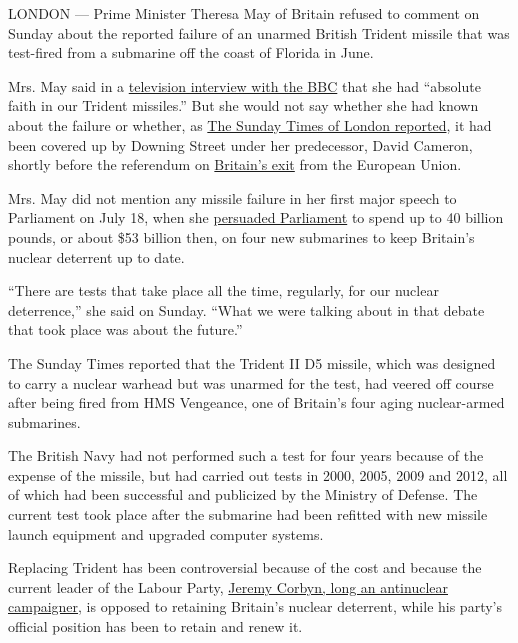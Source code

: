 LONDON --- Prime Minister Theresa May of Britain refused to comment on
Sunday about the reported failure of an unarmed British Trident missile
that was test-fired from a submarine off the coast of Florida in June.

Mrs. May said in a
\href{http://www.bbc.co.uk/news/uk-38708823}{television interview with
the BBC} that she had ``absolute faith in our Trident missiles.'' But
she would not say whether she had known about the failure or whether, as
\href{http://www.thetimes.co.uk/edition/news/no-10-covered-up-trident-missile-fiasco-hch3shsrn}{The
Sunday Times of London reported}, it had been covered up by Downing
Street under her predecessor, David Cameron, shortly before the
referendum on
\href{https://www.nytimes.com/news-event/britain-brexit-european-union}{Britain's
exit} from the European Union.

Mrs. May did not mention any missile failure in her first major speech
to Parliament on July 18, when she
\href{https://www.nytimes.com/2016/07/19/world/europe/theresa-may-britain-nuclear-weapons.html}{persuaded
Parliament} to spend up to 40 billion pounds, or about \$53 billion
then, on four new submarines to keep Britain's nuclear deterrent up to
date.

``There are tests that take place all the time, regularly, for our
nuclear deterrence,'' she said on Sunday. ``What we were talking about
in that debate that took place was about the future.''

The Sunday Times reported that the Trident II D5 missile, which was
designed to carry a nuclear warhead but was unarmed for the test, had
veered off course after being fired from HMS Vengeance, one of Britain's
four aging nuclear-armed submarines.

The British Navy had not performed such a test for four years because of
the expense of the missile, but had carried out tests in 2000, 2005,
2009 and 2012, all of which had been successful and publicized by the
Ministry of Defense. The current test took place after the submarine had
been refitted with new missile launch equipment and upgraded computer
systems.

Replacing Trident has been controversial because of the cost and because
the current leader of the Labour Party,
\href{https://www.nytimes.com/2016/01/18/world/europe/british-labour-leader-offers-compromise-on-trident-program.html}{Jeremy
Corbyn, long an antinuclear campaigner}, is opposed to retaining
Britain's nuclear deterrent, while his party's official position has
been to retain and renew it.

